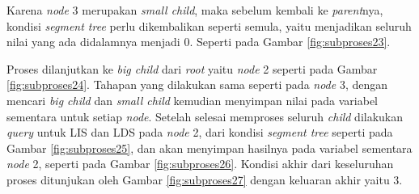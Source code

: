 \quad Karena \textit{node} 3 merupakan \textit{small child}, maka sebelum kembali ke \textit{parent}nya, kondisi \textit{segment tree} perlu dikembalikan seperti semula, yaitu menjadikan seluruh nilai yang ada didalamnya menjadi $0$. Seperti pada Gambar \ref{fig:subproses23}.

\quad Proses dilanjutkan ke \textit{big child} dari \textit{root} yaitu \textit{node} 2 seperti pada Gambar \ref{fig:subproses24}. Tahapan yang dilakukan sama seperti pada \textit{node} 3, dengan mencari \textit{big child} dan \textit{small child} kemudian menyimpan nilai pada variabel sementara untuk setiap \textit{node}. Setelah selesai memproses seluruh \textit{child} dilakukan \textit{query} untuk LIS dan LDS pada \textit{node} 2, dari kondisi \textit{segment tree} seperti pada Gambar \ref{fig:subproses25}, dan akan menyimpan hasilnya pada variabel sementara \textit{node} 2, seperti pada Gambar \ref{fig:subproses26}. Kondisi akhir dari keseluruhan proses ditunjukan oleh Gambar \ref{fig:subproses27} dengan keluaran akhir yaitu $3$.
